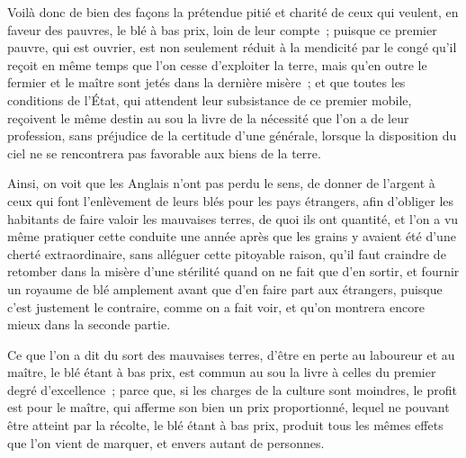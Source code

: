 \documentclass[french,twoside]{book} %
\begin{document}
Voilà donc de bien des façons la prétendue pitié et charité de ceux qui veulent, en faveur des pauvres, le blé à bas prix, loin de leur compte ; puisque ce premier pauvre, qui est ouvrier, est non seulement réduit à la mendicité par le congé qu’il reçoit en même temps que l’on cesse d’exploiter la terre, mais qu’en outre le fermier et le maître sont jetés dans la dernière misère ; et que toutes les conditions de l’État, qui attendent leur subsistance de ce premier mobile, reçoivent le même destin au sou la livre de la nécessité que l’on a de leur profession, sans préjudice de la certitude d’une générale, lorsque la disposition du ciel ne se rencontrera pas favorable aux biens de la terre.\par
Ainsi, on voit que les Anglais n’ont pas perdu le sens, de donner de l’argent à ceux qui font l’enlèvement de leurs blés pour les pays étrangers, afin d’obliger les habitants de faire valoir les mauvaises terres, de quoi ils ont quantité, et l’on a vu même pratiquer cette conduite une année après que les grains y avaient été d’une cherté extraordinaire, sans alléguer cette pitoyable raison, qu’il faut craindre de retomber dans la misère d’une stérilité quand on ne fait que d’en sortir, et fournir un royaume de blé amplement avant que d’en faire part aux étrangers, puisque c’est justement le contraire, comme on a fait voir, et qu’on montrera encore mieux dans la seconde partie.\par
Ce que l’on a dit du sort des mauvaises terres, d’être en perte au laboureur et au maître, le blé étant à bas prix, est commun au sou la livre à celles du premier degré d’excellence ; parce que, si les charges de la culture sont moindres, le profit est pour le maître, qui afferme son bien un prix proportionné, lequel ne pouvant être atteint par la récolte, le blé étant à bas prix, produit tous les mêmes effets que l’on vient de marquer, et envers autant de personnes.
\end{document}
